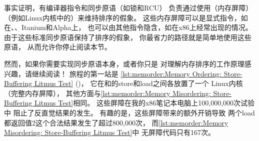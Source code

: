 事实证明，有编译器指令和同步原语（如锁和RCU）
负责通过使用\emph{}（内存屏障）
（例如Linux内核中的）来维持排序的假象。
这些内存屏障可以是显式指令，如在\ARM、\Power{}、Itanium和Alpha上，
也可以由其他指令隐含，如在x86上经常出现的情况。
由于这些标准同步原语保持了排序的假象，
你最省力的路径就是简单地使用这些原语，
从而允许你停止阅读本节。

\begin{listing}

\caption{内存排序：
			  Store-Buffering Litmus Test}
\label{lst:memorder:Memory Ordering: Store-Buffering Litmus Test}
\end{listing}

然而，如果你需要实现同步原语本身，或者你只是
对理解内存排序的工作原理感兴趣，请继续阅读！
旅程的第一站是
\cref{lst:memorder:Memory Ordering: Store-Buffering Litmus Test}
()，
它在和的store和load之间各放置了一个
 Linux内核（完整内存屏障），
其他方面与\cref{lst:memorder:Memory Misordering: Store-Buffering Litmus Test}相同。
这些屏障在我的x86笔记本电脑上100,000,000次试验中
阻止了反直觉结果的发生。
有趣的是，这些屏障带来的额外开销导致
两个load都返回值2这个合法结果发生了超过800,000次，
而\cref{lst:memorder:Memory Misordering: Store-Buffering Litmus Test}中
无屏障代码只有167次。

\begin{table}
\renewcommand*{\arraystretch}{1.1}
\small
\centering\OneColumnHSpace{-0.1in}
\caption{内存排序：
			  Store-Buffering事件序列}
\label{tab:memorder:Memory Ordering: Store-Buffering Sequence of Events}
\end{table}

